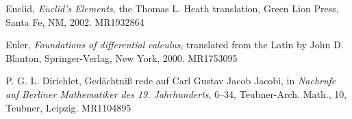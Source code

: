 \documentclass{rhumj_new}
\begin{document}



\begin{thebibliography}{10}


  Euclid, {\it Euclid's {\it Elements}}, the Thomas L. Heath translation, Green Lion Press, Santa
  Fe,
  NM, 2002. MR1932864

  Euler, {\it Foundations of differential calculus}, translated from the Latin by John D. Blanton,
  Springer-Verlag, New York, 2000. MR1753095

  P. G. L. Dirichlet, Ged\"{a}chtni\ss{} rede auf Carl Gustav Jacob Jacobi, in {\it Nachrufe auf
      Berliner Mathematiker des 19. Jahrhunderts}, 6--34, Teubner-Arch. Math., 10, Teubner,
  Leipzig.
  MR1104895

\end{thebibliography}
\end{document}
